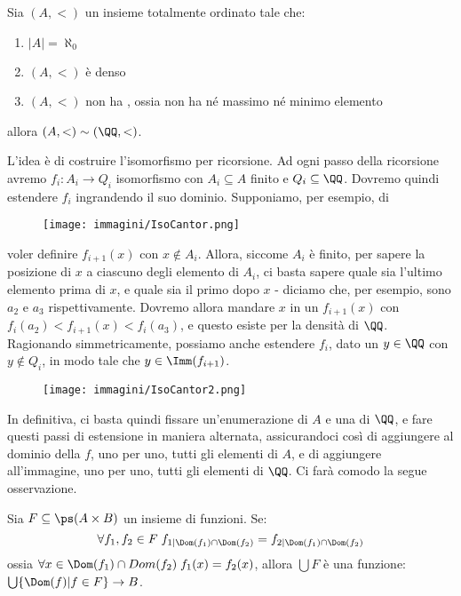 \documentclass[11pt]{scrartcl}
\begin{document}
\begin{theorem}
	\label{isoCantor}
	Sia $(A,<)$ un insieme totalmente ordinato tale che:
	\begin{enumerate}[1.]
		\item $|A| = \aleph_0$
		\item $(A,<)$ è denso
		\item $(A,<)$ non ha , ossia non ha né massimo né minimo elemento
	\end{enumerate}
	allora $(A,<)\sim(\QQ,<)$.
\end{theorem}

L'idea è di costruire l'isomorfismo per ricorsione. Ad ogni passo della ricorsione avremo $f_i : A_i \rightarrow Q_i$ isomorfismo con $A_i \subseteq A$ finito 
e $Q_i \subseteq \QQ$. Dovremo quindi estendere $f_i$ ingrandendo il suo dominio. Supponiamo, per esempio, di

\begin{figure}[h]
	\centering
	\texttt{[image: immagini/IsoCantor.png]}
\end{figure}

voler definire $f_{i+1}(x)$ con $x \not \in A_i$. Allora, siccome $A_i$ è finito, per sapere la posizione di $x$ a ciascuno degli elemento di $A_i$, ci basta sapere quale sia l'ultimo elemento prima di $x$,
e quale sia il primo dopo $x$ - diciamo che, per esempio, sono $a_2$  e $a_3$ rispettivamente. Dovremo allora mandare $x$ in un $f_{i+1}(x)$ con $f_i(a_2) < f_{i+1}(x) < f_i(a_3)$, e questo esiste per la densità di $\QQ$.
Ragionando simmetricamente, possiamo anche estendere $f_i$, dato un $y \in \QQ$ con $y \not\in Q_i$, in modo tale che $y \in \Imm(f_{i+1})$.

\begin{figure}[h]
	\centering
	\texttt{[image: immagini/IsoCantor2.png]}
\end{figure}

In definitiva, ci basta quindi fissare un'enumerazione di $A$ e una di $\QQ$, e fare questi passi di estensione in maniera alternata, assicurandoci così di aggiungere al dominio della $f$, uno per uno,
tutti gli elementi di $A$, e di aggiungere all'immagine, uno per uno, tutti gli elementi di $\QQ$. Ci farà comodo la segue osservazione.

\begin{remark}
	Sia $F \subseteq \ps(A \times B)$ un insieme di funzioni. Se:	
	\[ \forall f_1,f_2 \in F \; f_{1|\Dom(f_1) \cap \Dom(f_2)} = f_{2|\Dom(f_1) \cap \Dom(f_2)}
			\]
	ossia $\forall x \in \Dom(f_1) \cap Dom(f_2) \; f_1(x) = f_2(x)$, allora $\bigcup F$ è una funzione: $\bigcup\{\Dom(f) | f\in F\} \rightarrow B$.
\end{remark}
\end{document}
